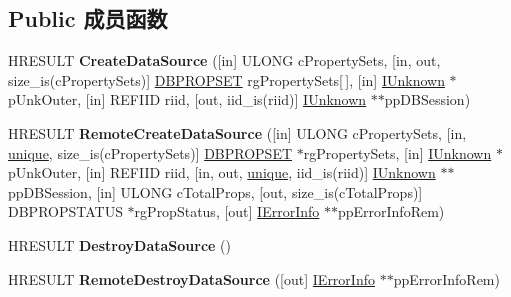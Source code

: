 \subsection*{Public 成员函数}
\begin{DoxyCompactItemize}
\item 
\mbox{\label{interface_i_d_b_data_source_admin_a88838d025a97541fd4d6f09a2385932b}} 
H\+R\+E\+S\+U\+LT {\bfseries Create\+Data\+Source} (\mbox{[}in\mbox{]} U\+L\+O\+NG c\+Property\+Sets, \mbox{[}in, out, size\+\_\+is(c\+Property\+Sets)\mbox{]} \hyperlink{structtag_d_b_p_r_o_p_s_e_t}{D\+B\+P\+R\+O\+P\+S\+ET} rg\+Property\+Sets\mbox{[}$\,$\mbox{]}, \mbox{[}in\mbox{]} \hyperlink{interface_i_unknown}{I\+Unknown} $\ast$p\+Unk\+Outer, \mbox{[}in\mbox{]} R\+E\+F\+I\+ID riid, \mbox{[}out, iid\+\_\+is(riid)\mbox{]} \hyperlink{interface_i_unknown}{I\+Unknown} $\ast$$\ast$pp\+D\+B\+Session)
\item 
\mbox{\label{interface_i_d_b_data_source_admin_af155cebb0679365590bf2617d9dcbe66}} 
H\+R\+E\+S\+U\+LT {\bfseries Remote\+Create\+Data\+Source} (\mbox{[}in\mbox{]} U\+L\+O\+NG c\+Property\+Sets, \mbox{[}in, \hyperlink{interfaceunique}{unique}, size\+\_\+is(c\+Property\+Sets)\mbox{]} \hyperlink{structtag_d_b_p_r_o_p_s_e_t}{D\+B\+P\+R\+O\+P\+S\+ET} $\ast$rg\+Property\+Sets, \mbox{[}in\mbox{]} \hyperlink{interface_i_unknown}{I\+Unknown} $\ast$p\+Unk\+Outer, \mbox{[}in\mbox{]} R\+E\+F\+I\+ID riid, \mbox{[}in, out, \hyperlink{interfaceunique}{unique}, iid\+\_\+is(riid)\mbox{]} \hyperlink{interface_i_unknown}{I\+Unknown} $\ast$$\ast$pp\+D\+B\+Session, \mbox{[}in\mbox{]} U\+L\+O\+NG c\+Total\+Props, \mbox{[}out, size\+\_\+is(c\+Total\+Props)\mbox{]} D\+B\+P\+R\+O\+P\+S\+T\+A\+T\+US $\ast$rg\+Prop\+Status, \mbox{[}out\mbox{]} \hyperlink{interface_i_error_info}{I\+Error\+Info} $\ast$$\ast$pp\+Error\+Info\+Rem)
\item 
\mbox{\label{interface_i_d_b_data_source_admin_a4abbbdef5b53e7795b07ebaf6bade0fa}} 
H\+R\+E\+S\+U\+LT {\bfseries Destroy\+Data\+Source} ()
\item 
\mbox{\label{interface_i_d_b_data_source_admin_aafe7645f7d05ef12b7f4ff01be600b16}} 
H\+R\+E\+S\+U\+LT {\bfseries Remote\+Destroy\+Data\+Source} (\mbox{[}out\mbox{]} \hyperlink{interface_i_error_info}{I\+Error\+Info} $\ast$$\ast$pp\+Error\+Info\+Rem)

\end{DoxyCompactItemize}
